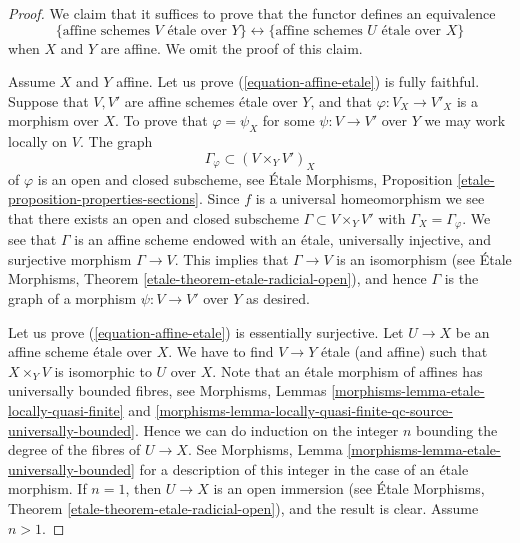 \begin{proof}
We claim that it suffices to prove that the functor defines
an equivalence
\begin{equation}
\label{equation-affine-etale}
\{
\text{affine schemes }V\text{ \'etale over }Y
\}
\leftrightarrow
\{
\text{affine schemes }U\text{ \'etale over }X
\}
\end{equation}
when $X$ and $Y$ are affine. We omit the proof of this claim.

\medskip\noindent
Assume $X$ and $Y$ affine.
Let us prove (\ref{equation-affine-etale}) is fully faithful. Suppose that
$V, V'$ are affine schemes \'etale over $Y$, and that $\varphi : V_X \to V'_X$
is a morphism over $X$. To prove that $\varphi = \psi_X$ for some
$\psi : V \to V'$ over $Y$ we may work locally on $V$. The graph
$$
\Gamma_\varphi \subset (V \times_Y V')_X
$$
of $\varphi$ is an open and closed subscheme, see
\'Etale Morphisms, Proposition \ref{etale-proposition-properties-sections}.
Since $f$ is a universal homeomorphism we see that there exists an
open and closed subscheme $\Gamma \subset V \times_Y V'$ with
$\Gamma_X = \Gamma_\varphi$. We see that $\Gamma$ is an affine scheme
endowed with an \'etale, universally injective, and surjective morphism
$\Gamma \to V$. This implies that $\Gamma \to V$ is an isomorphism (see
\'Etale Morphisms, Theorem \ref{etale-theorem-etale-radicial-open}),
and hence $\Gamma$ is the graph of a morphism $\psi : V \to V'$ over $Y$
as desired.

\medskip\noindent
Let us prove (\ref{equation-affine-etale}) is essentially surjective.
Let $U \to X$ be an affine scheme \'etale over $X$.
We have to find $V \to Y$ \'etale (and affine) such that $X \times_Y V$
is isomorphic to $U$ over $X$. Note that an \'etale morphism of affines
has universally bounded fibres, see
Morphisms,
Lemmas \ref{morphisms-lemma-etale-locally-quasi-finite} and
\ref{morphisms-lemma-locally-quasi-finite-qc-source-universally-bounded}.
Hence we can do induction on the integer $n$ bounding the degree of the fibres
of $U \to X$. See
Morphisms, Lemma \ref{morphisms-lemma-etale-universally-bounded}
for a description of this integer in the case of an \'etale morphism.
If $n = 1$, then $U \to X$ is an open immersion (see
\'Etale Morphisms, Theorem \ref{etale-theorem-etale-radicial-open}),
and the result is clear. Assume $n > 1$.


\end{proof}
